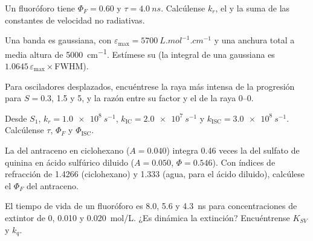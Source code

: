 \begin{exercise}[$\star$]\label{exo:b3:electronic-spectroscopy:4}
Un fluoróforo tiene $\Phi_F = 0.60$ y $\tau = \qty{4.0}{ns}$. Calcúlense $k_r$, el
 y la suma de las constantes de velocidad no radiativas.
\end{exercise}

\begin{exercise}[$\star\star$]\label{exo:b3:electronic-spectroscopy:5}
Una banda es gaussiana, con $\varepsilon_{\max} = \qty{5700}{L.mol^{-1}.cm^{-1}}$ y una anchura total a
media altura de \qty{5000}{cm^{-1}}. Estímese su  (la integral
de una gaussiana es $1.0645\,\varepsilon_{\max}\times$FWHM).
\end{exercise}

\begin{exercise}[$\star\star$]\label{exo:b3:electronic-spectroscopy:6}
Para osciladores desplazados, encuéntrese la raya más intensa de la progresión para
$S = 0.3$, 1.5 y 5, y la razón entre su factor y el de la raya 0--0.
\end{exercise}

\begin{exercise}[$\star\star$]\label{exo:b3:electronic-spectroscopy:7}
Desde $S_1$, $k_r = \qty{1.0e8}{s^{-1}}$, $k_{\mathrm{IC}} = \qty{2.0e7}{s^{-1}}$ y $k_{\mathrm{ISC}} =
\qty{3.0e8}{s^{-1}}$. Calcúlense $\tau$, $\Phi_F$ y $\Phi_{\mathrm{ISC}}$.
\end{exercise}

\begin{exercise}[$\star\star$]\label{exo:b3:electronic-spectroscopy:8}
La  del antraceno en ciclohexano ($A = 0.040$) integra 0.46
veces la del sulfato de quinina en ácido sulfúrico diluido ($A = 0.050$, $\Phi =
0.546$). Con índices de refracción de 1.4266 (ciclohexano) y 1.333 (agua, para el
ácido diluido), calcúlese el $\Phi_F$ del antraceno.
\end{exercise}

\begin{exercise}[$\star\star$]\label{exo:b3:electronic-spectroscopy:9}
El tiempo de vida de un fluoróforo es 8.0, 5.6 y \qty{4.3}{ns} para concentraciones de
extintor de 0, 0.010 y \qty{0.020}{mol/L}. ¿Es dinámica la extinción? Encuéntrense
$K_{SV}$ y $k_q$.
\end{exercise}

